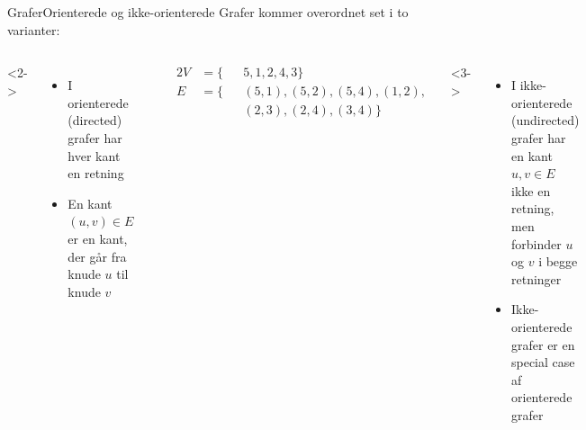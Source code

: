 \documentclass[aspectratio=1610]{beamer}
\begin{document}
\begin{frame}{Grafer}{Orienterede og ikke-orienterede}
    Grafer kommer overordnet set i to varianter:

    \begin{columns}[t]
        <2->
        \small
        \begin{itemize}
            \item I \alert{orienterede} (directed) grafer har hver kant en retning
            \item En kant $(u,v) \in E$ er en kant, der går \alert{fra} knude
                $u$ \alert{til} knude $v$
        \end{itemize}

        \begin{center}
        \end{center}
        \vspace{-\abovedisplayskip}
        \begin{alignat*}{2}
            V&= \{&& 5,1,2,4,3\} \\
            E&= \{&&(5,1),(5,2),(5,4),(1,2), \\ & &&(2,3),(2,4),(3,4) \}
        \end{alignat*}
    
        <3->
        \small
        \begin{itemize}
            \item I \alert{ikke-orienterede} (undirected) grafer har en kant
                ${u,v} \in E$ ikke en retning, men forbinder $u$ og $v$ i begge
                retninger
            \item Ikke-orienterede grafer er en special case af orienterede
                grafer
        \end{itemize}

        \begin{center}
\end{center}
\end{columns}
\end{frame}
\end{document}

